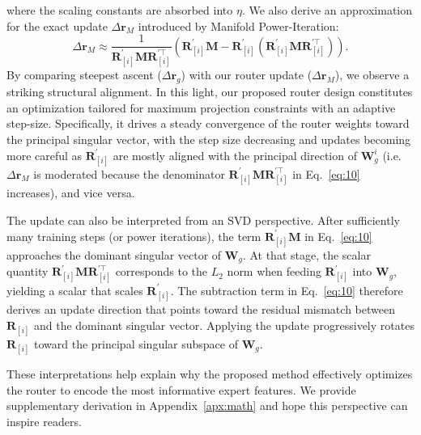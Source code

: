 \documentclass{llmxive}
\providecommand{\bm}[1]{\boldsymbol{#1}}
\providecommand{\vr}{{\bm{r}}}
\providecommand{\mM}{{\bm{M}}}
\providecommand{\mR}{{\bm{R}}}
\providecommand{\mW}{{\bm{W}}}
\begin{document}
where the scaling constants are absorbed into $\eta$.
We also derive an approximation for the exact update $\Delta \vr_{M}$ introduced by Manifold Power-Iteration:
\begin{equation} 
   \Delta \vr_{M} \approx \frac{1}{\mR_{[i]}^\prime \mM \mR_{[i]}^{\prime\top}} {\left( \mR_{[i]}^\prime \mM - \mR_{[i]}^\prime(\mR_{[i]}^\prime \mM \mR_{[i]}^{\prime\top}) \right)}.
   \label{eq:10}
\end{equation}
By comparing steepest ascent ($\Delta \vr_{g}$) with our router update ($\Delta \vr_{M}$), we observe a striking structural alignment.
In this light, our proposed router design constitutes an optimization tailored for maximum projection constraints with an adaptive step-size.
Specifically, it drives a steady convergence of the router weights toward the principal singular vector, with the step size decreasing and updates becoming more careful as $\mR_{[i]}^\prime$ are mostly aligned with the principal direction of $\mW_g^i$ (i.e. $\Delta \vr_{M}$ is moderated because the denominator $\mR_{[i]}^\prime \mM \mR_{[i]}^{\prime\top}$ in Eq.~\ref{eq:10} increases), and vice versa.

The update can also be interpreted from an SVD perspective. After sufficiently many training steps (or power iterations), the term $\mR_{[i]}^\prime \mM$ in Eq.~\ref{eq:10} approaches the dominant singular vector of $\mW_g$.
At that stage, the scalar quantity $\mR_{[i]}^\prime \mM \mR_{[i]}^{\prime\top}$ corresponds to the $L_2$ norm when feeding $\mR_{[i]}^\prime$ into $\mW_g$, yielding a scalar that scales $\mR_{[i]}^\prime$. 
The subtraction term in Eq.~\ref{eq:10} therefore derives an update direction that points toward the residual mismatch between $\mR_{[i]}$ and the dominant singular vector. 
Applying the update progressively rotates $\mR_{[i]}$ toward the principal singular subspace of $\mW_g$.

These interpretations help explain why the proposed method effectively optimizes the router to encode the most informative expert features.
We provide supplementary derivation in Appendix~\ref{apx:math} and hope this perspective can inspire readers.
\end{document}
